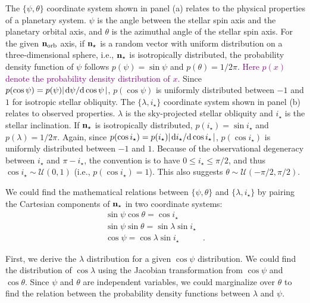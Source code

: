 \documentclass[twocolumn,times]{aastex631}
\newcommand{\edits}[1]{\textcolor{purple}{#1}}
\begin{document}
The $\{\psi, \theta\}$ coordinate system shown in panel (a) relates to the physical properties of a planetary system. $\psi$ is the angle between the stellar spin axis and the planetary orbital axis, and $\theta$ is the azimuthal angle of the stellar spin axis. For the given $\bf{n}_{\rm orb}$ axis, if $\bf{n}_{\star}$ is a random vector with uniform distribution on a three-dimensional sphere, i.e., $\bf{n}_{\star}$ is isotropically distributed, the probability density function of $\psi$ follows $p(\psi) = \sin{\psi}$ and $p(\theta) = 1/2\pi$.
\edits{Here $p(x)$ denote the probability density distribution of $x$.}
Since $p(\cos{\psi}) = p(\psi) \abs{\dv*{\psi}{\cos{\psi}}}$, $p(\cos{\psi})$ is uniformly distributed between $-1$ and $1$ for isotropic stellar obliquity.
The $\{\lambda, i_\star\}$ coordinate system shown in panel (b) relates to observed properties. $\lambda$ is the sky-projected stellar obliquity and $i_\star$ is the stellar inclination. If $\bf{n}_{\star}$ is isotropically distributed, $p(i_\star) = \sin{i_\star}$ and $p(\lambda) = 1/2\pi$. Again, since $p(\cos{i_\star}) = p(i_\star) \abs{\dv*{i_\star}{\cos{i_\star}}}$, $p(\cos{i_\star})$ is uniformly distributed between $-1$ and $1$. 
Because of the observational degeneracy between $i_\star$ and $\pi - i_\star$, the convention is to have $0 \leqslant i_\star \leqslant \pi/2$, and thus $\cos{i_\star} \sim \mathcal{U}(0, 1)$ (i.e., $p(\cos{i_\star}) = 1$). This also suggests $\theta \sim \mathcal{U}(-\pi/2, \pi/2)$.

We could find the mathematical relations between $\{\psi, \theta\}$ and $\{\lambda, i_\star\}$ by pairing the Cartesian components of $\bf{n}_{\star}$ in two coordinate systems:
\begin{align}
    \sin{\psi}\cos{\theta} = \cos{i_\star}& \label{eq:coord1}\\
    \sin{\psi}\sin{\theta} = \sin{\lambda}\sin{i_\star}& \label{eq:coord2}\\
    \cos{\psi} = \cos{\lambda}\sin{i_\star} \label{eq:coord3}&.
\end{align}

First, we derive the $\lambda$ distribution for a given $\cos{\psi}$ distribution. We could find the distribution of $\cos{\lambda}$ using the Jacobian transformation from $\cos{\psi}$ and $\cos{\theta}$. Since $\psi$ and $\theta$ are independent variables, we could marginalize over $\theta$ to find the relation between the probability density functions between $\lambda$ and $\psi$.
\end{document}
